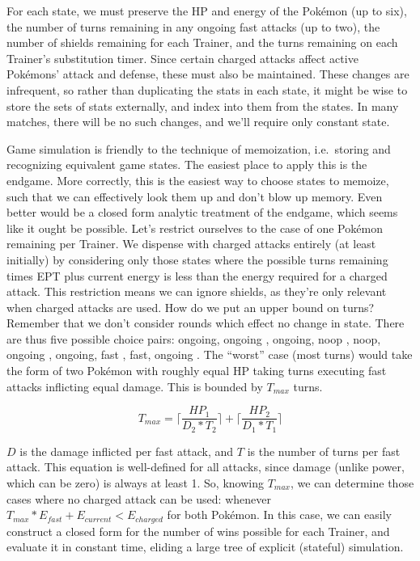 For each state, we must preserve the HP and energy of the Pokémon (up to six),
  the number of turns remaining in any ongoing fast attacks (up to two),
  the number of shields remaining for each Trainer,
  and the turns remaining on each Trainer's substitution timer.
Since certain charged attacks affect active Pokémons' attack and defense,
  these must also be maintained.
These changes are infrequent, so rather than duplicating the stats in
  each state, it might be wise to store the sets of stats externally,
  and index into them from the states.
In many matches, there will be no such changes, and we'll require
  only constant state.

Game simulation is friendly to the technique of memoization, i.e.\ storing
  and recognizing equivalent game states.
The easiest place to apply this is the endgame.
More correctly, this is the easiest way to choose states to memoize,
  such that we can effectively look them up and don't blow up memory.
Even better would be a closed form analytic treatment of the endgame,
  which seems like it ought be possible.
Let's restrict ourselves to the case of one Pokémon remaining per Trainer.
We dispense with charged attacks entirely (at least initially) by considering
  only those states where the possible turns remaining times EPT plus current
  energy is less than the energy required for a charged attack.
This restriction means we can ignore shields, as they're only relevant
  when charged attacks are used.
How do we put an upper bound on turns?
Remember that we don't consider rounds which effect no change in state.
There are thus five possible choice pairs:
  { ongoing, ongoing },
  { ongoing, noop },
  { noop, ongoing },
  { ongoing, fast },
  { fast, ongoing }.
The ``worst'' case (most turns) would take the form of two Pokémon
  with roughly equal HP taking turns executing fast attacks
  inflicting equal damage.
This is bounded by $T_{max}$ turns.

\[ T_{max} = \lceil\frac{HP_1}{D_2 * T_2}\rceil + \lceil\frac{HP_2}{D_1 * T_1}\rceil \]

$D$ is the damage inflicted per fast attack, and $T$ is the number of turns per fast attack.
This equation is well-defined for all attacks, since damage (unlike power,
  which can be zero) is always at least 1.
So, knowing $T_{max}$, we can determine those cases where no charged attack
  can be used: whenever $T_{max} * E_{fast} + E_{current} < E_{charged}$ for both Pokémon.
In this case, we can easily construct a closed form for the number of wins
  possible for each Trainer, and evaluate it in constant time, eliding
  a large tree of explicit (stateful) simulation.
